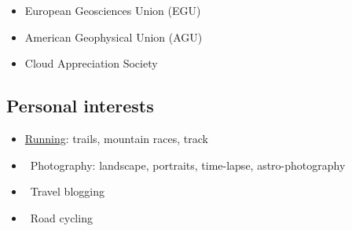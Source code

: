 \documentclass[11pt,a4paper,svgnames]{article}
\begin{document}
\begin{itemize}
\item European Geosciences Union (EGU)
\item American Geophysical Union (AGU)
\item Cloud Appreciation Society
\end{itemize}



\subsection{Personal interests}

\begin{itemize}
\item \href{http://www.wikiloc.com/wikiloc/user.do?id=458033}{Running}: trails, mountain races, track
\item \href{https://500px.com/charlestroupin}{\faicon{500px}}~\href{https://www.flickr.com/photos/sharlo1982/}{\faFlickr}{Photography: landscape, portraits, time-lapse, astro-photography}
\item \faWordpress~Travel blogging
\item \faBicycle~Road cycling
\end{itemize}
\end{document}
